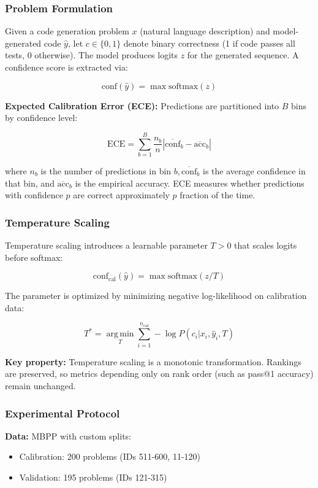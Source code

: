 
\subsubsection{Problem Formulation}

Given a code generation problem $x$ (natural language description) and model-generated code $\hat{y}$, let $c \in \{0, 1\}$ denote binary correctness (1 if code passes all tests, 0 otherwise). The model produces logits $z$ for the generated sequence. A confidence score is extracted via:

$$\text{conf}(\hat{y}) = \max \text{softmax}(z)$$

\textbf{Expected Calibration Error (ECE):} Predictions are partitioned into $B$ bins by confidence level:

$$\text{ECE} = \sum_{b=1}^{B} \frac{n_b}{n} | \overline{\text{conf}}_b - \overline{\text{acc}}_b |$$

where $n_b$ is the number of predictions in bin $b, \overline{\text{conf}}_b$ is the average confidence in that bin, and $\overline{\text{acc}}_b$ is the empirical accuracy. ECE measures whether predictions with confidence $p$ are correct approximately $p$ fraction of the time.

\subsubsection{Temperature Scaling}

Temperature scaling introduces a learnable parameter $T > 0$ that scales logits before softmax:

$$\text{conf}_{\text{cal}}(\hat{y}) = \max \text{softmax}(z / T)$$

The parameter is optimized by minimizing negative log-likelihood on calibration data:

$$T^* = \operatorname*{arg\,min}_T \sum_{i=1}^{n_{\text{cal}}} -\log P(c_i | x_i, \hat{y}_i, T)$$

\textbf{Key property:} Temperature scaling is a monotonic transformation. Rankings are preserved, so metrics depending only on rank order (such as pass@1 accuracy) remain unchanged.

\subsubsection{Experimental Protocol}

\textbf{Data:} MBPP with custom splits:
\begin{itemize}
\item Calibration: 200 problems (IDs 511-600, 11-120)
\item Validation: 195 problems (IDs 121-315)
\end{itemize}


